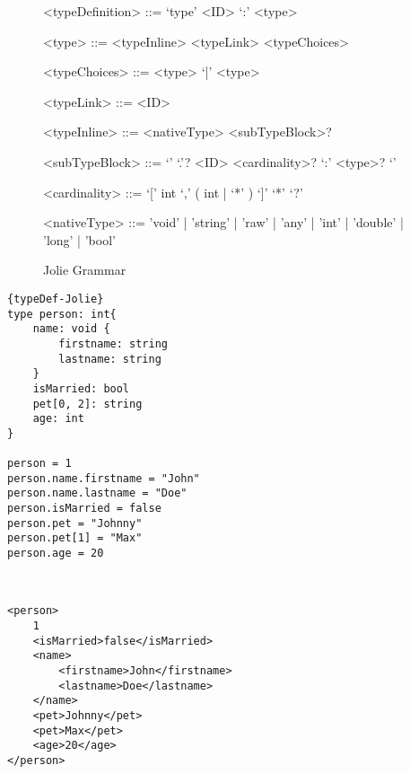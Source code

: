 \begin{figure}
	\begin{framed}
		\begin{grammar}
			<typeDefinition> ::= `type' <ID> `:' <type>

			<type> ::= <typeInline>
			\alt <typeLink>
			\alt <typeChoices>

			<typeChoices> ::= <type> `|' <type>

			<typeLink> ::= <ID>

			<typeInline> ::= <nativeType> <subTypeBlock>?

			<subTypeBlock> ::= `{' `.'? <ID> <cardinality>? `:' <type>? `}'

			<cardinality> ::= `[' int `,' ( int | `*' ) `]'
			\alt `*'
			\alt `?'

			<nativeType> ::= 'void' | 'string' | 'raw' | 'any' | 'int' | 'double' | 'long' | 'bool'
		\end{grammar}
	\end{framed}
	\caption{Jolie Grammar\protect\footnotemark}
	\label{fig:TypeDefinitonSyntax}
\end{figure}


\begin{listing}
\begin{sublisting}{\linewidth}

\lstset{language=Jolie,
	style=codeStyle
}
\begin{lstlisting}[frame=tlrb, caption= {Constructing a type and value in Jolie}, label={list:type-value}]{typeDef-Jolie}
type person: int{
	name: void {
		firstname: string
		lastname: string
	}
	isMarried: bool
	pet[0, 2]: string
	age: int
}

person = 1
person.name.firstname = "John"
person.name.lastname = "Doe"
person.isMarried = false
person.pet = "Johnny"
person.pet[1] = "Max"
person.age = 20
\end{lstlisting}
\end{sublisting}\\[2ex]
\begin{sublisting}{\linewidth}
\lstset{language=XML,
showspaces=false
}
\begin{lstlisting}[frame=tlrb, caption= {XML representation of ~\ref{list:type-value}}, label={list:type-value-xml}]
<person>
	1
	<isMarried>false</isMarried>
	<name>
		<firstname>John</firstname>
		<lastname>Doe</lastname>
	</name>
	<pet>Johnny</pet>
	<pet>Max</pet>
	<age>20</age>
</person>
\end{lstlisting}
\end{sublisting}
\caption{ Jolie type Example }
\label{fig:TypeDefinitonUsage}
\end{listing}

\FloatBarrier